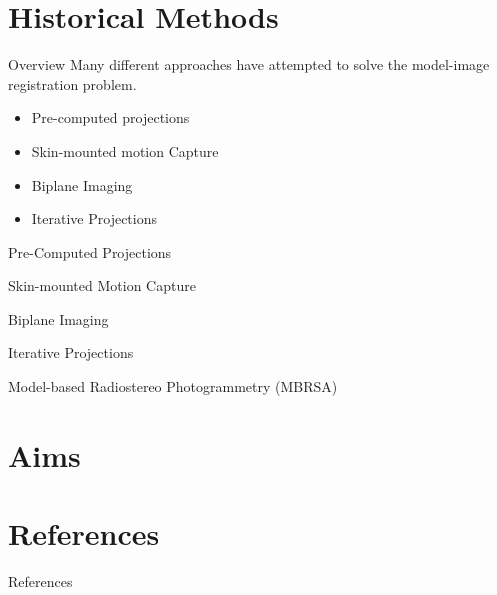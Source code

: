 \documentclass[presentation]{beamer}
\begin{document}
\section{Historical Methods}
\label{sec:org54f4bf4}
\begin{frame}[label={sec:org7fbe41e}]{Overview}
Many different approaches have attempted to solve the model-image registration problem.
\begin{itemize}
\item Pre-computed projections
\item Skin-mounted motion Capture
\item Biplane Imaging
\item Iterative Projections
\end{itemize}
\end{frame}
\begin{frame}[label={sec:org46401c2}]{Pre-Computed Projections}
\end{frame}
\begin{frame}[label={sec:org9cac4da}]{Skin-mounted Motion Capture}
\end{frame}
\begin{frame}[label={sec:orgf25771e}]{Biplane Imaging}
\end{frame}
\begin{frame}[label={sec:org7f96c1d}]{Iterative Projections}
\end{frame}
\begin{frame}[label={sec:org7986f53}]{Model-based Radiostereo Photogrammetry (MBRSA)}
\end{frame}
\section{Aims}
\label{sec:org9340308}


\section{References}
\label{sec:orge201e70}
\begin{frame}[label={sec:orgcfc2455},fragile, allowframebreaks, label=]{References}
\AtNextBibliography{\tiny}
\printbibliography
\end{frame}
\end{document}
